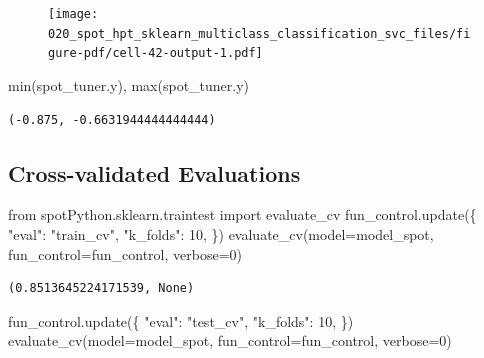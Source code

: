\documentclass[
  letterpaper,
  DIV=11,
  numbers=noendperiod]{scrreprt}
\newenvironment{Shaded}{\begin{snugshade}}{\end{snugshade}}
\newcommand{\BuiltInTok}[1]{\textcolor[rgb]{0.00,0.23,0.31}{#1}}
\newcommand{\DecValTok}[1]{\textcolor[rgb]{0.68,0.00,0.00}{#1}}
\newcommand{\ImportTok}[1]{\textcolor[rgb]{0.00,0.46,0.62}{#1}}
\newcommand{\NormalTok}[1]{\textcolor[rgb]{0.00,0.23,0.31}{#1}}
\newcommand{\OperatorTok}[1]{\textcolor[rgb]{0.37,0.37,0.37}{#1}}
\newcommand{\StringTok}[1]{\textcolor[rgb]{0.13,0.47,0.30}{#1}}
\begin{document}
\begin{figure}[H]

{\centering \texttt{[image: 020\_spot\_hpt\_sklearn\_multiclass\_classification\_svc\_files/figure-pdf/cell-42-output-1.pdf]}

}

\end{figure}

\begin{Shaded}
\begin{Highlighting}[]
\BuiltInTok{min}\NormalTok{(spot\_tuner.y), }\BuiltInTok{max}\NormalTok{(spot\_tuner.y)}
\end{Highlighting}
\end{Shaded}

\begin{verbatim}
(-0.875, -0.6631944444444444)
\end{verbatim}

\hypertarget{cross-validated-evaluations-2}{%
\subsection{Cross-validated
Evaluations}\label{cross-validated-evaluations-2}}

\begin{Shaded}
\begin{Highlighting}[]
\ImportTok{from}\NormalTok{ spotPython.sklearn.traintest }\ImportTok{import}\NormalTok{ evaluate\_cv}
\NormalTok{fun\_control.update(\{}
     \StringTok{"eval"}\NormalTok{: }\StringTok{"train\_cv"}\NormalTok{,}
     \StringTok{"k\_folds"}\NormalTok{: }\DecValTok{10}\NormalTok{,}
\NormalTok{\})}
\NormalTok{evaluate\_cv(model}\OperatorTok{=}\NormalTok{model\_spot, fun\_control}\OperatorTok{=}\NormalTok{fun\_control, verbose}\OperatorTok{=}\DecValTok{0}\NormalTok{)}
\end{Highlighting}
\end{Shaded}

\begin{verbatim}
(0.8513645224171539, None)
\end{verbatim}

\begin{Shaded}
\begin{Highlighting}[]
\NormalTok{fun\_control.update(\{}
     \StringTok{"eval"}\NormalTok{: }\StringTok{"test\_cv"}\NormalTok{,}
     \StringTok{"k\_folds"}\NormalTok{: }\DecValTok{10}\NormalTok{,}
\NormalTok{\})}
\NormalTok{evaluate\_cv(model}\OperatorTok{=}\NormalTok{model\_spot, fun\_control}\OperatorTok{=}\NormalTok{fun\_control, verbose}\OperatorTok{=}\DecValTok{0}\NormalTok{)}
\end{Highlighting}
\end{Shaded}
\end{document}
